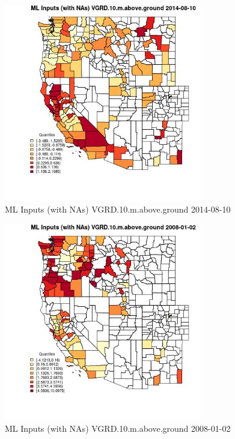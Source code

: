 \begin{figure} 
\centering  
\includegraphics[width=0.77\textwidth]{Code_Outputs/Report_ML_input_PM25_Step4_part_e_de_duplicated_aves_compiled_2019-05-18wNAs_CountyVGRD10mabovegroundMean2014-08-10_2014-08-10.jpg} 
\caption{\label{fig:Report_ML_input_PM25_Step4_part_e_de_duplicated_aves_compiled_2019-05-18wNAsCountyVGRD10mabovegroundMean2014-08-10_2014-08-10}ML Inputs (with NAs) VGRD.10.m.above.ground 2014-08-10} 
\end{figure} 
 

\begin{figure} 
\centering  
\includegraphics[width=0.77\textwidth]{Code_Outputs/Report_ML_input_PM25_Step4_part_e_de_duplicated_aves_compiled_2019-05-18wNAs_CountyVGRD10mabovegroundMean2008-01-02_2008-01-02.jpg} 
\caption{\label{fig:Report_ML_input_PM25_Step4_part_e_de_duplicated_aves_compiled_2019-05-18wNAsCountyVGRD10mabovegroundMean2008-01-02_2008-01-02}ML Inputs (with NAs) VGRD.10.m.above.ground 2008-01-02} 
\end{figure} 
 

